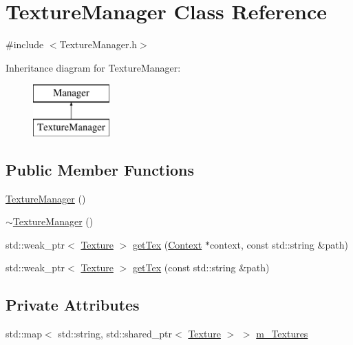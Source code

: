 \hypertarget{class_texture_manager}{}\section{Texture\+Manager Class Reference}
\label{class_texture_manager}


{\ttfamily \#include $<$Texture\+Manager.\+h$>$}

Inheritance diagram for Texture\+Manager\+:\begin{figure}[H]
\begin{center}
\leavevmode
\includegraphics[height=2.000000cm]{class_texture_manager}
\end{center}
\end{figure}
\subsection*{Public Member Functions}
\begin{DoxyCompactItemize}
\item 
\hyperlink{class_texture_manager_ad76abb178b37cedf4514eb0154349935}{Texture\+Manager} ()
\item 
\hyperlink{class_texture_manager_a001d6d74674961db79987e3222682576}{$\sim$\+Texture\+Manager} ()
\item 
std\+::weak\+\_\+ptr$<$ \hyperlink{class_texture}{Texture} $>$ \hyperlink{class_texture_manager_ace3da9513d2c0cb1bdcec6652a6318f9}{get\+Tex} (\hyperlink{class_context}{Context} $\ast$context, const std\+::string \&path)
\item 
std\+::weak\+\_\+ptr$<$ \hyperlink{class_texture}{Texture} $>$ \hyperlink{class_texture_manager_aba074bba0c567f28c94d0c88678fff97}{get\+Tex} (const std\+::string \&path)
\end{DoxyCompactItemize}
\subsection*{Private Attributes}
\begin{DoxyCompactItemize}
\item 
std\+::map$<$ std\+::string, std\+::shared\+\_\+ptr$<$ \hyperlink{class_texture}{Texture} $>$ $>$ \hyperlink{class_texture_manager_a7cf0073a30a272f5dd4660026de58b08}{m\+\_\+\+Textures}
\end{DoxyCompactItemize}


